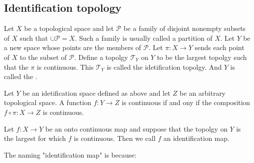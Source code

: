 \subsection{Identification topology}
\label{sec:Identification topology}

\begin{defi}
Let $X$ be a topological space and let $\mathscr{P}$ be a family of
disjoint nonempty subsets of $X$ such that $\cup \mathscr{P}=X$. Such
a family is usually called a partition of $X$. Let $Y$ be a new space
whose points are the members of $\mathscr{P}$. Let $\pi:X\to Y$ sends
each point of $X$ to the subset of $\mathscr{P}$. Define a topolgy
$\mathcal{T}_Y$ on $Y$ to be the largest topolgy such that the $\pi$
is continuous. This $\mathcal{T}_Y$ is called the idetification topolgy.
And $Y$ is called the .
\end{defi}
\begin{center}  \end{center}
\begin{thm}
    Let $Y$ be an idetification space defined as above and let $Z$ be
    an arbitrary topological space. A function $f:Y\to Z$ is
    continuous if and ony if the composition $f\circ \pi:X\to Z$ is
    continuous.
\end{thm}
\begin{center}  \end{center}
\begin{defi}
    Let $f:X\to Y$ be an onto continuous map and suppose that the topolgy on $Y$
    is the largest for which $f$ is continuous. Then we call $f$ an
    identification map.
\end{defi}
The naming "identification map" is because:
